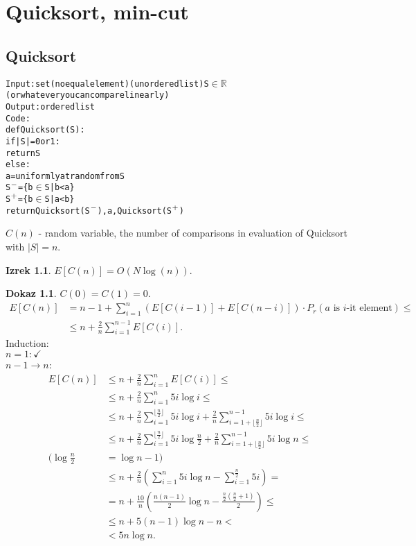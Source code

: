 \documentclass[a4paper, 12pt]{book}
\theoremstyle{definition}
\newtheorem{theorem}[counter]{Izrek}
\newtheorem{pro}[counter]{Dokaz}
\theoremstyle{remark}
\newcommand{\R}{\mathbb{R}}
\begin{document}
\chapter{Quicksort, min-cut}


\section{Quicksort}

\begin{alltt}
  Input: set (no equal element) (unordered list) S\(\in\R\)
      (or whatever you can compare linearly)
  Output: ordered list
  Code:
    def Quicksort(S):
      if |S|= 0 or 1:
        return S
      else:
        a = uniformly at random from S
        S\(\sp{-}\) = \{b \(\in\) S | b < a\}
        S\(\sp{+}\) = \{b \(\in\) S | a < b\}
        return Quicksort(S\(\sp{-}\)), a, Quicksort(S\(\sp{+}\))
\end{alltt}
$C(n)$ - random variable, the number of comparisons in evaluation of Quicksort with $|S| = n$.
\begin{theorem}
  $E[C(n)] = O(N \log(n))$.
\end{theorem}
\begin{pro}
  $C(0) = C(1) = 0$. \\
  \begin{align*}
    E[C(n)] &= n - 1 + \sum_{i=1}^{n} \left(E[C(i-1)] + E[C(n-i)]\right) \cdot P_r(a \text{ is $i$-it element}) \leq \\
    &\leq n + \frac{2}{n} \sum_{i=1}^{n-1} E[C(i)].
  \end{align*}
  Induction: \\
  $n = 1: \checkmark$ \\
  $n-1 \to n$:
  \begin{align*}
    E[C(n)] &\leq n + \frac{2}{n} \sum_{i=1}^{n} E[C(i)] \leq \\
    &\leq n + \frac{2}{n} \sum_{i=1}^{n} 5i \log i \leq \\
    &\leq n + \frac{2}{n} \sum_{i=1}^{\lfloor\frac{n}{2}\rfloor} 5i \log i +
      \frac{2}{n} \sum_{i=1+\lfloor\frac{n}{2}\rfloor}^{n-1} 5i \log i \leq \\
    &\leq n + \frac{2}{n} \sum_{i=1}^{\lfloor\frac{n}{2}\rfloor} 5i \log \frac{n}{2} +
      \frac{2}{n} \sum_{i=1+\lfloor\frac{n}{2}\rfloor}^{n-1} 5i \log n \leq \\
    (\log \frac{n}{2} &= \log n - 1) \\
    &\leq n + \frac{2}{n} \left(\sum_{i=1}^n 5i \log n - \sum_{i=1}^{\frac{n}{2}} 5i\right) = \\
    &= n + \frac{10}{n} \left(\frac{n(n-1)}{2} \log n - \frac{\frac{n}{2} (\frac{n}{2} + 1)}{2}\right) \leq \\
    &\leq n + 5(n-1) \log n - n < \\
    &< 5n \log n.
  \end{align*}
\end{pro}
\end{document}
